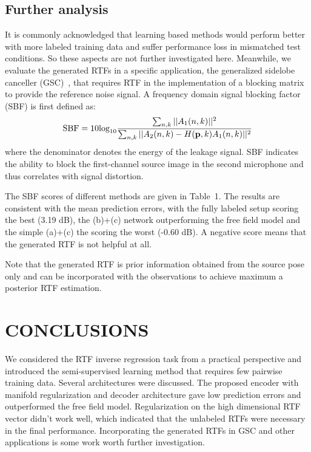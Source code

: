 \documentclass{article}
\begin{document}


\subsection{Further analysis}

It is commonly acknowledged that learning based methods would perform better with more labeled training data and suffer performance loss in mismatched test conditions. So these aspects are not further investigated here. Meanwhile, we evaluate the generated RTFs in a specific application, the generalized sidelobe canceller (GSC)~\cite{gannot2001signal}, that requires RTF in the implementation of a blocking matrix to provide the reference noise signal. A frequency domain signal blocking factor (SBF) is first defined as:
\begin{equation}\label{eq:sbf}
  \text{SBF}=10\text{log}_{10}\frac{\sum_{n,k} ||A_1(n,k)||^2}{\sum_{n,k} ||A_2(n,k)-H({\bf p},k)A_1(n,k)||^2}
\end{equation}
where the denominator denotes the energy of the leakage signal. SBF indicates the ability to block the first-channel source image in the second microphone and thus correlates with signal distortion.

The SBF scores of different methods are given in Table~1. The results are consistent with the mean prediction errors, with the fully labeled setup scoring the best (3.19 dB), the (b)+(c) network outperforming the free field model and the simple (a)+(c) the scoring the worst (-0.60 dB). A negative score means that the generated RTF is not helpful at all.

Note that the generated RTF is prior information obtained from the source pose only and can be incorporated with the observations to achieve maximum a posterior RTF estimation.


\section{CONCLUSIONS}
\label{sec:con}

We considered the RTF inverse regression task from a practical perspective and introduced the semi-supervised learning method that requires few pairwise training data. Several architectures were discussed. The proposed encoder with manifold regularization and decoder architecture gave low prediction errors and outperformed the free field model. Regularization on the high dimensional RTF vector didn't work well, which indicated that the unlabeled RTFs were necessary in the final performance. Incorporating the generated RTFs in GSC and other applications is some work worth further investigation.
\end{document}
